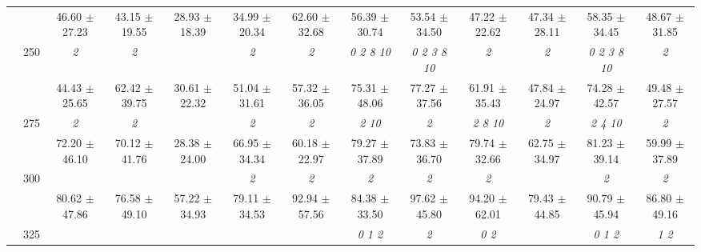 \begin{table}[h]
{\begin{tabular}{
        ccccccccccccc}
 & & \cellcolor[HTML]{EFEFEF} 46.60 $\pm$ 27.23& \cellcolor[HTML]{EFEFEF} 43.15 $\pm$ 19.55& \cellcolor[HTML]{EFEFEF} 28.93 $\pm$ 18.39& \cellcolor[HTML]{EFEFEF} 34.99 $\pm$ 20.34& \cellcolor[HTML]{EFEFEF} 62.60 $\pm$ 32.68& \cellcolor[HTML]{EFEFEF} 56.39 $\pm$ 30.74& \cellcolor[HTML]{EFEFEF} 53.54 $\pm$ 34.50& \cellcolor[HTML]{EFEFEF} 47.22 $\pm$ 22.62& \cellcolor[HTML]{EFEFEF} 47.34 $\pm$ 28.11& \cellcolor[HTML]{EFEFEF} 58.35 $\pm$ 34.45& \cellcolor[HTML]{EFEFEF} 48.67 $\pm$ 31.85 \\ 
 & \multirow{2}{*}{250}& \textit{ 2 }& \textit{ 2 }& & \textit{ 2 }& \textit{ 2 }& \textit{  0  2  8 10 }& \textit{  0  2  3  8 10 }& \textit{ 2 }& \textit{ 2 }& \textit{  0  2  3  8 10 }& \textit{ 2 } \\ 
 & & 44.43 $\pm$ 25.65& 62.42 $\pm$ 39.75& 30.61 $\pm$ 22.32& 51.04 $\pm$ 31.61& 57.32 $\pm$ 36.05& 75.31 $\pm$ 48.06& 77.27 $\pm$ 37.56& 61.91 $\pm$ 35.43& 47.84 $\pm$ 24.97& 74.28 $\pm$ 42.57& 49.48 $\pm$ 27.57 \\ 
 & \multirow{2}{*}{275}& \cellcolor[HTML]{EFEFEF} \textit{ 2 }& \cellcolor[HTML]{EFEFEF} \textit{ 2 }& \cellcolor[HTML]{EFEFEF} & \cellcolor[HTML]{EFEFEF} \textit{ 2 }& \cellcolor[HTML]{EFEFEF} \textit{ 2 }& \cellcolor[HTML]{EFEFEF} \textit{  2 10 }& \cellcolor[HTML]{EFEFEF} \textit{ 2 }& \cellcolor[HTML]{EFEFEF} \textit{  2  8 10 }& \cellcolor[HTML]{EFEFEF} \textit{ 2 }& \cellcolor[HTML]{EFEFEF} \textit{  2  4 10 }& \cellcolor[HTML]{EFEFEF} \textit{ 2 } \\ 
 & & \cellcolor[HTML]{EFEFEF} 72.20 $\pm$ 46.10& \cellcolor[HTML]{EFEFEF} 70.12 $\pm$ 41.76& \cellcolor[HTML]{EFEFEF} 28.38 $\pm$ 24.00& \cellcolor[HTML]{EFEFEF} 66.95 $\pm$ 34.34& \cellcolor[HTML]{EFEFEF} 60.18 $\pm$ 22.97& \cellcolor[HTML]{EFEFEF} 79.27 $\pm$ 37.89& \cellcolor[HTML]{EFEFEF} 73.83 $\pm$ 36.70& \cellcolor[HTML]{EFEFEF} 79.74 $\pm$ 32.66& \cellcolor[HTML]{EFEFEF} 62.75 $\pm$ 34.97& \cellcolor[HTML]{EFEFEF} 81.23 $\pm$ 39.14& \cellcolor[HTML]{EFEFEF} 59.99 $\pm$ 37.89 \\ 
 & \multirow{2}{*}{300}& & & & \textit{ 2 }& \textit{ 2 }& \textit{ 2 }& \textit{ 2 }& \textit{ 2 }& & \textit{ 2 }& \textit{ 2 } \\ 
 & & 80.62 $\pm$ 47.86& 76.58 $\pm$ 49.10& 57.22 $\pm$ 34.93& 79.11 $\pm$ 34.53& 92.94 $\pm$ 57.56& 84.38 $\pm$ 33.50& 97.62 $\pm$ 45.80& 94.20 $\pm$ 62.01& 79.43 $\pm$ 44.85& 90.79 $\pm$ 45.94& 86.80 $\pm$ 49.16 \\ 
 & \multirow{2}{*}{325}& \cellcolor[HTML]{EFEFEF} & \cellcolor[HTML]{EFEFEF} & \cellcolor[HTML]{EFEFEF} & \cellcolor[HTML]{EFEFEF} & \cellcolor[HTML]{EFEFEF} & \cellcolor[HTML]{EFEFEF} \textit{ 0 1 2 }& \cellcolor[HTML]{EFEFEF} \textit{ 2 }& \cellcolor[HTML]{EFEFEF} \textit{ 0 2 }& \cellcolor[HTML]{EFEFEF} & \cellcolor[HTML]{EFEFEF} \textit{ 0 1 2 }& \cellcolor[HTML]{EFEFEF} \textit{ 1 2 } \\ 

\end{tabular}}
\end{table}
